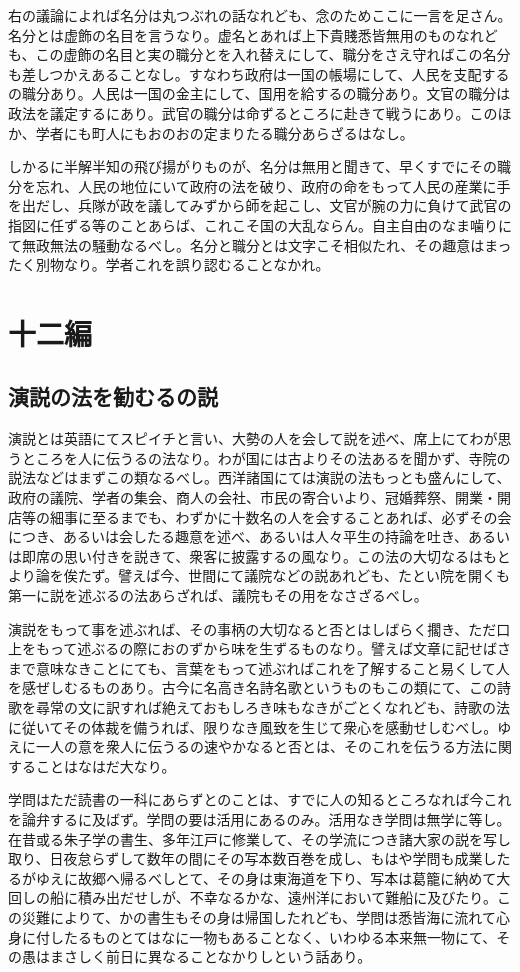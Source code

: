 \documentclass[a4paper, platex, dvipdfmx]{jsarticle}
\begin{document}
右の議論によれば名分は丸つぶれの話なれども、念のためここに一言を足さん。名分とは虚飾の名目を言うなり。虚名とあれば上下貴賤悉皆無用のものなれども、この虚飾の名目と実の職分とを入れ替えにして、職分をさえ守ればこの名分も差しつかえあることなし。すなわち政府は一国の帳場にして、人民を支配するの職分あり。人民は一国の金主にして、国用を給するの職分あり。文官の職分は政法を議定するにあり。武官の職分は命ずるところに赴きて戦うにあり。このほか、学者にも町人にもおのおの定まりたる職分あらざるはなし。

しかるに半解半知の飛び揚がりものが、名分は無用と聞きて、早くすでにその職分を忘れ、人民の地位にいて政府の法を破り、政府の命をもって人民の産業に手を出だし、兵隊が政を議してみずから師を起こし、文官が腕の力に負けて武官の指図に任ずる等のことあらば、これこそ国の大乱ならん。自主自由のなま噛りにて無政無法の騒動なるべし。名分と職分とは文字こそ相似たれ、その趣意はまったく別物なり。学者これを誤り認むることなかれ。

\section{十二編}
\subsection{演説の法を勧むるの説}
演説とは英語にてスピイチと言い、大勢の人を会して説を述べ、席上にてわが思うところを人に伝うるの法なり。わが国には古よりその法あるを聞かず、寺院の説法などはまずこの類なるべし。西洋諸国にては演説の法もっとも盛んにして、政府の議院、学者の集会、商人の会社、市民の寄合いより、冠婚葬祭、開業・開店等の細事に至るまでも、わずかに十数名の人を会することあれば、必ずその会につき、あるいは会したる趣意を述べ、あるいは人々平生の持論を吐き、あるいは即席の思い付きを説きて、衆客に披露するの風なり。この法の大切なるはもとより論を俟たず。譬えば今、世間にて議院などの説あれども、たとい院を開くも第一に説を述ぶるの法あらざれば、議院もその用をなさざるべし。

演説をもって事を述ぶれば、その事柄の大切なると否とはしばらく擱き、ただ口上をもって述ぶるの際におのずから味を生ずるものなり。譬えば文章に記せばさまで意味なきことにても、言葉をもって述ぶればこれを了解すること易くして人を感ぜしむるものあり。古今に名高き名詩名歌というものもこの類にて、この詩歌を尋常の文に訳すれば絶えておもしろき味もなきがごとくなれども、詩歌の法に従いてその体裁を備うれば、限りなき風致を生じて衆心を感動せしむべし。ゆえに一人の意を衆人に伝うるの速やかなると否とは、そのこれを伝うる方法に関することはなはだ大なり。

学問はただ読書の一科にあらずとのことは、すでに人の知るところなれば今これを論弁するに及ばず。学問の要は活用にあるのみ。活用なき学問は無学に等し。在昔或る朱子学の書生、多年江戸に修業して、その学流につき諸大家の説を写し取り、日夜怠らずして数年の間にその写本数百巻を成し、もはや学問も成業したるがゆえに故郷へ帰るべしとて、その身は東海道を下り、写本は葛籠に納めて大回しの船に積み出だせしが、不幸なるかな、遠州洋において難船に及びたり。この災難によりて、かの書生もその身は帰国したれども、学問は悉皆海に流れて心身に付したるものとてはなに一物もあることなく、いわゆる本来無一物にて、その愚はまさしく前日に異なることなかりしという話あり。
\end{document}
